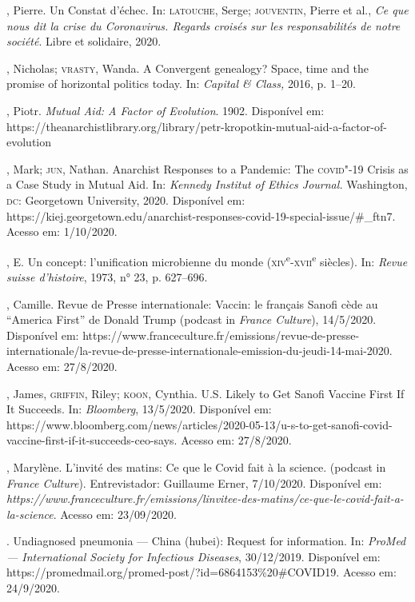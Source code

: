 \begin{bibliohedra}
, Pierre. Un Constat d'échec. In: \textsc{latouche}, Serge; \textsc{jouventin},
Pierre et al., \emph{Ce que nous dit la crise du Coronavirus. Regards
croisés sur les responsabilités de notre société}. Libre et solidaire,
2020.

, Nicholas; \textsc{vrasty}, Wanda. A Convergent genealogy? Space, time
and the promise of horizontal politics today. In: \emph{Capital \&
Class,} 2016, p. 1--20.

, Piotr. \emph{Mutual Aid: A Factor of Evolution}. 1902.
Disponível em:
https://theanarchistlibrary.org/library/petr-kropotkin-mutual-aid-a-factor-of-evolution

, Mark; \textsc{jun}, Nathan. Anarchist Responses to a Pandemic: The
\textsc{covid}"-19 Crisis as a Case Study in Mutual Aid. In: \emph{Kennedy
Institut of Ethics Journal.} Washington, \textsc{dc}: Georgetown University,
2020. Disponível em:
https://kiej.georgetown.edu/anarchist-responses-covid-19-special-issue/\#\_ftn7.
Acesso em: 1/10/2020.

, E. Un concept: l'unification microbienne du monde
(\textsc{xiv}\textsuperscript{e}-\textsc{xvii}\textsuperscript{e} siècles). In:
\emph{Revue suisse d'histoire}, 1973, n° 23, p. 627--696.

, Camille. Revue de Presse internationale: Vaccin: le français
Sanofi cède au ``America First'' de Donald Trump (podcast in \emph{France
Culture}), 14/5/2020. Disponível em:
https://www.franceculture.fr/emissions/revue-de-presse-internationale/la-revue-de-presse-internationale-emission-du-jeudi-14-mai-2020.
Acesso em: 27/8/2020.

, James, \textsc{griffin}, Riley; \textsc{koon}, Cynthia. U.S. Likely to Get Sanofi
Vaccine First If It Succeeds. In: \emph{Bloomberg}, 13/5/2020.
Disponível em:
https://www.bloomberg.com/news/articles/2020-05-13/u-s-to-get-sanofi-covid-vaccine-first-if-it-succeeds-ceo-says.
Acesso em: 27/8/2020.

, Marylène. L'invité des matins: Ce que le Covid fait à la
science. (podcast in \emph{France Culture}). Entrevistador: Guillaume
Erner, 7/10/2020. Disponível em:
\emph{https://www.franceculture.fr/emissions/linvitee-des-matins/ce-que-le-covid-fait-a-la-science}.
Acesso em: 23/09/2020.

. Undiagnosed pneumonia --- China (hubei): Request for
information. In: \emph{ProMed --- International Society for Infectious
Diseases}, 30/12/2019. Disponível em:
https://promedmail.org/promed-post/?id=6864153\%20\#COVID19. Acesso em:
24/9/2020.


\end{bibliohedra}
